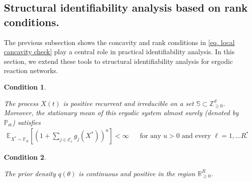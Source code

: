 \documentclass[pdflatex,sn-mathphys-num]{sn-jnl}%
\def\supp{\text{supp}} %
\theoremstyle{thmstyleone}%
\theoremstyle{thmstyletwo}%
\newtheorem{condition}{Condition}
\theoremstyle{thmstylethree}%
\begin{document}
\subsection{Structural identifiability analysis based on rank conditions.}

The previous subsection shows the concavity and rank conditions in \eqref{eq. local cancavity check} play a central role in practical identifiability analysis.
In this section, we extend these tools to structural identifiability analysis for ergodic reaction networks. 



\begin{condition}\label{Condition recurrence and irreducibility}

    The process $X(t)$ is positive recurrent and irreducible on a set $\mathbb S \subset \mathbb Z_{\geq 0}^d$.
    Moreover, the stationary mean of this ergodic system almost surely (denoted by $\mathbb P_\text{st}$) satisfies 
    \begin{align}\label{eq. finiteness of the moments}
        \mathbb E_{X^* \sim \mathbb P_\text{st}}\left[
            \left(1 + 
            \sum_{j\in\mathcal C_\ell} g_j(X^*)
            \right)^u\right] < \infty
        && \text{for any $u>0$ and every $\ell = 1,\dots R^*$}.
    \end{align}
\end{condition}

\begin{condition}\label{condition boundedness of the support}

    The prior density $q(\theta)$ is continuous and positive in the region $\mathbb R^{R}_{\geq 0}$.
\end{condition}
\end{document}
